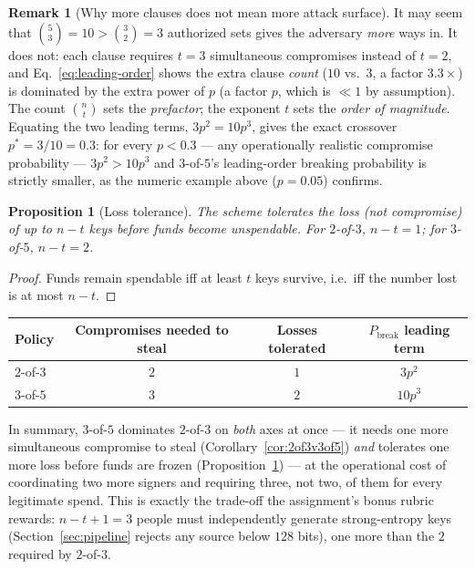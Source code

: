 \documentclass[11pt,a4paper]{article}
\theoremstyle{plain}
\newtheorem{proposition}[theorem]{Proposition}
\theoremstyle{definition}
\newtheorem{remark}[theorem]{Remark}
\begin{document}
\begin{remark}[Why more clauses does not mean more attack surface]
It may seem that $\binom{5}{3}=10>\binom{3}{2}=3$ authorized sets gives the
adversary \emph{more} ways in. It does not: each clause requires $t=3$
simultaneous compromises instead of $t=2$, and Eq.~\eqref{eq:leading-order}
shows the extra clause \emph{count} ($10$ vs.\ $3$, a factor $3.3\times$) is
dominated by the extra power of $p$ (a factor $p$, which is $\ll1$ by
assumption). The count $\binom{n}{t}$ sets the \emph{prefactor}; the exponent
$t$ sets the \emph{order of magnitude}. Equating the two leading terms,
$3p^2=10p^3$, gives the exact crossover $p^\ast=3/10=0.3$: for every
$p<0.3$ --- any operationally realistic compromise probability ---
$3p^2>10p^3$ and $3$-of-$5$'s leading-order breaking probability is strictly
smaller, as the numeric example above ($p=0.05$) confirms.
\end{remark}

\begin{proposition}[Loss tolerance]\label{prop:loss-tolerance}
The scheme tolerates the loss (not compromise) of up to $n-t$ keys before
funds become unspendable. For $2$-of-$3$, $n-t=1$; for $3$-of-$5$, $n-t=2$.
\end{proposition}
\begin{proof}
Funds remain spendable iff at least $t$ keys survive, i.e.\ iff the number
lost is at most $n-t$.
\end{proof}

\begin{center}
\begin{tabular}{@{}lccc@{}}
\toprule
Policy & Compromises needed to steal & Losses tolerated & $P_{\mathrm{break}}$ leading term \\
\midrule
$2$-of-$3$ & $2$ & $1$ & $3p^2$ \\
$3$-of-$5$ & $3$ & $2$ & $10p^3$ \\
\bottomrule
\end{tabular}
\end{center}

\noindent In summary, $3$-of-$5$ dominates $2$-of-$3$ on \emph{both} axes at
once --- it needs one more simultaneous compromise to steal
(Corollary~\ref{cor:2of3v3of5}) \emph{and} tolerates one more loss before
funds are frozen (Proposition~\ref{prop:loss-tolerance}) --- at the
operational cost of coordinating two more signers and requiring three, not
two, of them for every legitimate spend. This is exactly the trade-off the
assignment's bonus rubric rewards: $n-t+1=3$ people must independently
generate strong-entropy keys (Section~\ref{sec:pipeline} rejects any source
below $128$ bits), one more than the $2$ required by $2$-of-$3$.
\end{document}
